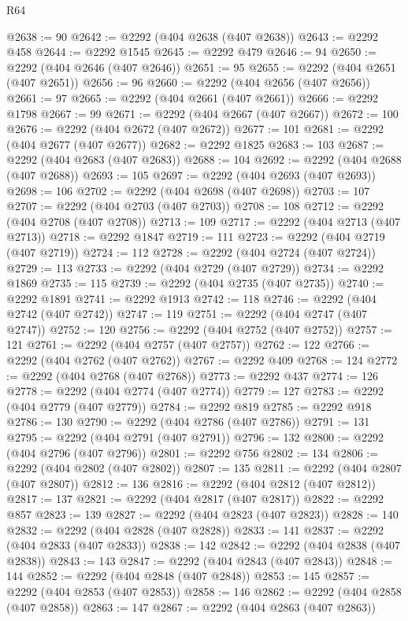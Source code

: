 \begin{lexlean}{R64}
\begin{coremodule}
@2638 := 90
@2642 := @2292 (@404 @2638 (@407 @2638))
@2643 := @2292 @458
@2644 := @2292 @1545
@2645 := @2292 @479
@2646 := 94
@2650 := @2292 (@404 @2646 (@407 @2646))
@2651 := 95
@2655 := @2292 (@404 @2651 (@407 @2651))
@2656 := 96
@2660 := @2292 (@404 @2656 (@407 @2656))
@2661 := 97
@2665 := @2292 (@404 @2661 (@407 @2661))
@2666 := @2292 @1798
@2667 := 99
@2671 := @2292 (@404 @2667 (@407 @2667))
@2672 := 100
@2676 := @2292 (@404 @2672 (@407 @2672))
@2677 := 101
@2681 := @2292 (@404 @2677 (@407 @2677))
@2682 := @2292 @1825
@2683 := 103
@2687 := @2292 (@404 @2683 (@407 @2683))
@2688 := 104
@2692 := @2292 (@404 @2688 (@407 @2688))
@2693 := 105
@2697 := @2292 (@404 @2693 (@407 @2693))
@2698 := 106
@2702 := @2292 (@404 @2698 (@407 @2698))
@2703 := 107
@2707 := @2292 (@404 @2703 (@407 @2703))
@2708 := 108
@2712 := @2292 (@404 @2708 (@407 @2708))
@2713 := 109
@2717 := @2292 (@404 @2713 (@407 @2713))
@2718 := @2292 @1847
@2719 := 111
@2723 := @2292 (@404 @2719 (@407 @2719))
@2724 := 112
@2728 := @2292 (@404 @2724 (@407 @2724))
@2729 := 113
@2733 := @2292 (@404 @2729 (@407 @2729))
@2734 := @2292 @1869
@2735 := 115
@2739 := @2292 (@404 @2735 (@407 @2735))
@2740 := @2292 @1891
@2741 := @2292 @1913
@2742 := 118
@2746 := @2292 (@404 @2742 (@407 @2742))
@2747 := 119
@2751 := @2292 (@404 @2747 (@407 @2747))
@2752 := 120
@2756 := @2292 (@404 @2752 (@407 @2752))
@2757 := 121
@2761 := @2292 (@404 @2757 (@407 @2757))
@2762 := 122
@2766 := @2292 (@404 @2762 (@407 @2762))
@2767 := @2292 @409
@2768 := 124
@2772 := @2292 (@404 @2768 (@407 @2768))
@2773 := @2292 @437
@2774 := 126
@2778 := @2292 (@404 @2774 (@407 @2774))
@2779 := 127
@2783 := @2292 (@404 @2779 (@407 @2779))
@2784 := @2292 @819
@2785 := @2292 @918
@2786 := 130
@2790 := @2292 (@404 @2786 (@407 @2786))
@2791 := 131
@2795 := @2292 (@404 @2791 (@407 @2791))
@2796 := 132
@2800 := @2292 (@404 @2796 (@407 @2796))
@2801 := @2292 @756
@2802 := 134
@2806 := @2292 (@404 @2802 (@407 @2802))
@2807 := 135
@2811 := @2292 (@404 @2807 (@407 @2807))
@2812 := 136
@2816 := @2292 (@404 @2812 (@407 @2812))
@2817 := 137
@2821 := @2292 (@404 @2817 (@407 @2817))
@2822 := @2292 @857
@2823 := 139
@2827 := @2292 (@404 @2823 (@407 @2823))
@2828 := 140
@2832 := @2292 (@404 @2828 (@407 @2828))
@2833 := 141
@2837 := @2292 (@404 @2833 (@407 @2833))
@2838 := 142
@2842 := @2292 (@404 @2838 (@407 @2838))
@2843 := 143
@2847 := @2292 (@404 @2843 (@407 @2843))
@2848 := 144
@2852 := @2292 (@404 @2848 (@407 @2848))
@2853 := 145
@2857 := @2292 (@404 @2853 (@407 @2853))
@2858 := 146
@2862 := @2292 (@404 @2858 (@407 @2858))
@2863 := 147
@2867 := @2292 (@404 @2863 (@407 @2863))

\end{coremodule}
\end{lexlean}
